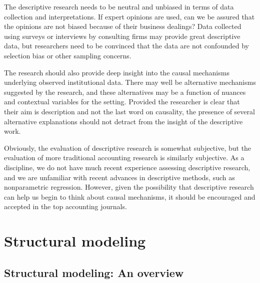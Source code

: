 \documentclass[12pt,reqno,titlepage]{amsart}
\theoremstyle{definition}
\begin{document}
\begin{doublespace}
The descriptive research needs to be neutral and unbiased in terms of data collection and interpretations.
If expert opinions are used, can we be assured that the opinions are not biased because of their business dealings?
Data collected using surveys or interviews by consulting firms may provide great descriptive data, but researchers need to be convinced that the data are not confounded by selection bias or other sampling concerns.

The research should also provide deep insight into the causal mechanisms underlying observed institutional data.
There may well be alternative mechanisms suggested by the research, and these alternatives may be a function of nuances and contextual variables for the setting. Provided the researcher is clear that their aim is description and not the last word on causality, the presence of several alternative explanations should not detract from the insight of the descriptive work.

Obviously, the evaluation of descriptive research is somewhat subjective, but the evaluation of more traditional accounting research is similarly subjective. 
As a discipline, we do not have much recent experience assessing descriptive research, and we are unfamiliar with recent advances in descriptive methods, such as nonparametric regression. 
However, given the possibility that descriptive research can help us begin to think about causal mechanisms, it should be encouraged and accepted in the top accounting journals.

\section{Structural modeling} \label{sec:struct}

\subsection{Structural modeling: An overview}


\end{doublespace}
\end{document}
